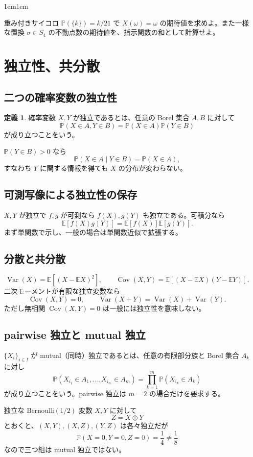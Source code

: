 \documentclass[a4paper,11pt,pdflatex,ja=standard,jafont=ipaex-type1,
  magstyle=real,scale=1]{bxjsarticle}
\theoremstyle{definition}
\newtheorem{definition}[theorem]{定義}
\theoremstyle{remark}
\newenvironment{exerciseblock}
{\par\medskip\begin{adjustwidth}{1em}{1em}\small\sffamily{\bfseries\color{SoftGray}演習・補足}\par\vspace{0.2em}}
{\end{adjustwidth}\medskip}
\newcommand{\E}{\mathbb E}
\newcommand{\Pp}{\mathbb P}
\newcommand{\1}{\mathbf 1}
\newcommand{\Var}{\operatorname{Var}}
\newcommand{\Cov}{\operatorname{Cov}}
\begin{document}
\begin{exerciseblock}
重み付きサイコロ $\Pp(\{k\})=k/21$ で $X(\omega)=\omega$ の期待値を求めよ。また一様な置換 $\sigma\in S_4$ の不動点数の期待値を、指示関数の和として計算せよ。
\end{exerciseblock}
\section{独立性、共分散}
\subsection{二つの確率変数の独立性}
\begin{definition}
確率変数 $X,Y$ が独立であるとは、任意の Borel 集合 $A,B$ に対して
\[
\Pp(X\in A,Y\in B)=\Pp(X\in A)\Pp(Y\in B)
\]
が成り立つことをいう。
\end{definition}
$\Pp(Y\in B)>0$ なら
\[
\Pp(X\in A\mid Y\in B)=\Pp(X\in A),
\]
すなわち $Y$ に関する情報を得ても $X$ の分布が変わらない。

\subsection{可測写像による独立性の保存}
$X,Y$ が独立で $f,g$ が可測なら $f(X),g(Y)$ も独立である。可積分なら
\[
\E[f(X)g(Y)]=\E[f(X)]\E[g(Y)].
\]
まず単関数で示し、一般の場合は単関数近似で拡張する。

\subsection{分散と共分散}
\[
\Var(X)=\E[(X-\E X)^2],
\qquad
\Cov(X,Y)=\E[(X-\E X)(Y-\E Y)].
\]
二次モーメントが有限な独立変数なら
\[
\Cov(X,Y)=0,
\qquad
\Var(X+Y)=\Var(X)+\Var(Y).
\]
ただし無相関 $\Cov(X,Y)=0$ は一般には独立性を意味しない。

\subsection{pairwise 独立と mutual 独立}
$\{X_i\}_{i\in I}$ が mutual（同時）独立であるとは、任意の有限部分族と Borel 集合 $A_k$ に対し
\[
\Pp(X_{i_1}\in A_1,\dots,X_{i_m}\in A_m)
=\prod_{k=1}^m\Pp(X_{i_k}\in A_k)
\]
が成り立つことをいう。pairwise 独立は $m=2$ の場合だけを要求する。

独立な Bernoulli$(1/2)$ 変数 $X,Y$ に対して
\[
Z=X\oplus Y
\]
とおくと、$(X,Y),(X,Z),(Y,Z)$ は各々独立だが
\[
\Pp(X=0,Y=0,Z=0)=\frac14\ne\frac18
\]
なので三つ組は mutual 独立ではない。
\end{document}
